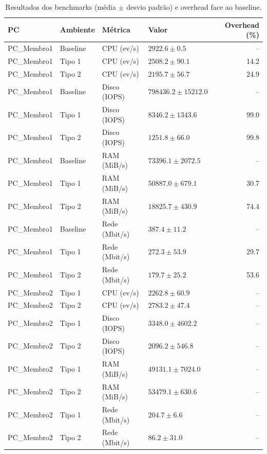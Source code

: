 \begin{table}[htbp]
\centering
\caption{Resultados dos benchmarks (média $\pm$ desvio padrão) e overhead face ao baseline.}
\label{tab:resultados}
\begin{tabular}{llllr}
\toprule
PC & Ambiente & Métrica & Valor & Overhead (\%) \\
\midrule
PC\_Membro1 & Baseline & CPU (ev/s) & $2922.6 \pm 0.5$ & -- \\
PC\_Membro1 & Tipo 1 & CPU (ev/s) & $2508.2 \pm 90.1$ & 14.2 \\
PC\_Membro1 & Tipo 2 & CPU (ev/s) & $2195.7 \pm 56.7$ & 24.9 \\
PC\_Membro1 & Baseline & Disco (IOPS) & $798436.2 \pm 15212.0$ & -- \\
PC\_Membro1 & Tipo 1 & Disco (IOPS) & $8346.2 \pm 1343.6$ & 99.0 \\
PC\_Membro1 & Tipo 2 & Disco (IOPS) & $1251.8 \pm 66.0$ & 99.8 \\
PC\_Membro1 & Baseline & RAM (MiB/s) & $73396.1 \pm 2072.5$ & -- \\
PC\_Membro1 & Tipo 1 & RAM (MiB/s) & $50887.0 \pm 679.1$ & 30.7 \\
PC\_Membro1 & Tipo 2 & RAM (MiB/s) & $18825.7 \pm 430.9$ & 74.4 \\
PC\_Membro1 & Baseline & Rede (Mbit/s) & $387.4 \pm 11.2$ & -- \\
PC\_Membro1 & Tipo 1 & Rede (Mbit/s) & $272.3 \pm 53.9$ & 29.7 \\
PC\_Membro1 & Tipo 2 & Rede (Mbit/s) & $179.7 \pm 25.2$ & 53.6 \\
PC\_Membro2 & Tipo 1 & CPU (ev/s) & $2262.8 \pm 60.9$ & -- \\
PC\_Membro2 & Tipo 2 & CPU (ev/s) & $2783.2 \pm 47.4$ & -- \\
PC\_Membro2 & Tipo 1 & Disco (IOPS) & $3348.0 \pm 4602.2$ & -- \\
PC\_Membro2 & Tipo 2 & Disco (IOPS) & $2096.2 \pm 546.8$ & -- \\
PC\_Membro2 & Tipo 1 & RAM (MiB/s) & $49131.1 \pm 7024.0$ & -- \\
PC\_Membro2 & Tipo 2 & RAM (MiB/s) & $53479.1 \pm 630.6$ & -- \\
PC\_Membro2 & Tipo 1 & Rede (Mbit/s) & $204.7 \pm 6.6$ & -- \\
PC\_Membro2 & Tipo 2 & Rede (Mbit/s) & $86.2 \pm 31.0$ & -- \\
\bottomrule
\end{tabular}
\end{table}
